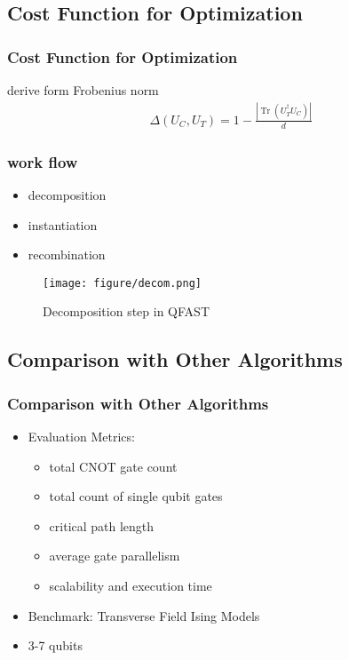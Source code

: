 \subsection{Cost Function for Optimization}

\begin{frame}
\frametitle{Cost Function for Optimization}
derive form Frobenius norm
\begin{align}
  \Delta\left(U_{C}, U_{T}\right)=1-\frac{\left|\operatorname{Tr}\left(U_{T}^{\dagger} U_{C}\right)\right|}{d}
\end{align}
\end{frame}

\begin{frame}
  \frametitle{work flow}
  \begin{itemize}
    \item decomposition
    \item instantiation
    \item recombination
  \end{itemize}
  \begin{figure}
    \texttt{[image: figure/decom.png]}
    \caption{Decomposition step in QFAST}
  \end{figure}
\end{frame}

\subsection{Comparison with Other Algorithms}
\begin{frame}
\frametitle{Comparison with Other Algorithms}
\begin{itemize}
  \item Evaluation Metrics:
  \begin{itemize}
    \item total CNOT gate count
    \item total count of single qubit gates
    \item critical path length
    \item average gate parallelism
    \item scalability and execution time
  \end{itemize}
  \item Benchmark: Transverse Field Ising Models
  \item 3-7 qubits
\end{itemize}
\end{frame}

